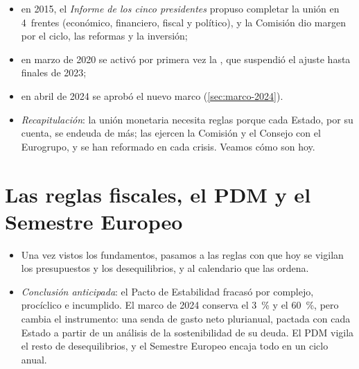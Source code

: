 \documentclass[11pt]{article}
\begin{document}
\begin{itemize}
\begin{enumerate}
\begin{itemize}
    \item en 2015, el \emph{Informe de los cinco presidentes} propuso completar la unión en 4~frentes (económico, financiero, fiscal y político)\nocite{CE2015CincoPresidentes}, y la Comisión dio margen por el ciclo, las reformas y la inversión;
    \item en marzo de 2020 se activó por primera vez la , que suspendió el ajuste hasta finales de 2023;
    \item en abril de 2024 se aprobó el nuevo marco (\ref{sec:marco-2024}).
    \end{itemize}
  \end{enumerate}
\end{itemize}

\begin{infografia}[H]
\centering
\caption{Cronología de la gobernanza económica de la Unión, 1992-2026}\label{figu:cronologia}
\end{infografia}

\begin{itemize}
\item \emph{Recapitulación}: la unión monetaria necesita reglas porque cada Estado, por su cuenta, se endeuda de más; las ejercen la Comisión y el Consejo con el Eurogrupo, y se han reformado en cada crisis. Veamos cómo son hoy.
\end{itemize}

\section{Las reglas fiscales, el PDM y el Semestre Europeo}\label{sec:reglas}

\begin{itemize}
\item Una vez vistos los fundamentos, pasamos a las reglas con que hoy se vigilan los presupuestos y los desequilibrios, y al calendario que las ordena.
\item \emph{Conclusión anticipada}: el Pacto de Estabilidad fracasó por complejo, procíclico e incumplido. El marco de 2024 conserva el 3~\% y el 60~\%, pero cambia el instrumento: una senda de gasto neto plurianual, pactada con cada Estado a partir de un análisis de la sostenibilidad de su deuda. El PDM vigila el resto de desequilibrios, y el Semestre Europeo encaja todo en un ciclo anual.
\end{itemize}
\end{document}
